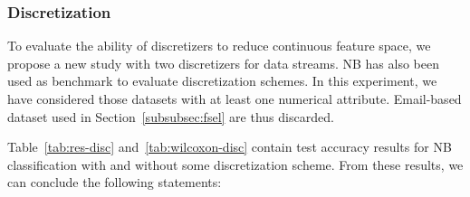 \documentclass[preprint,12pt]{elsarticle}
\begin{document}
\subsubsection{\textbf{Discretization}}
\label{subsubsec:disc}

To evaluate the ability of discretizers to reduce continuous feature space, we propose a new study with two discretizers for data streams. NB has also been used as benchmark to evaluate discretization schemes. In this experiment, we have considered those datasets with at least one numerical attribute. Email-based dataset used in Section~\ref{subsubsec:fsel} are thus discarded.

Table~\ref{tab:res-disc} and~\ref{tab:wilcoxon-disc} contain test accuracy results for NB classification with and without some discretization scheme. From these results, we can conclude the following statements:

\begin{table*}[!t]
  \caption{Classification test accuracy after discretization} \label{tab:res-disc}
  \centering
\end{table*}
\end{document}
